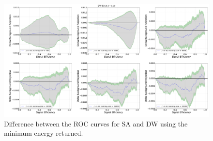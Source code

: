 \begin{figure}[h]
\begin{adjustbox}{center}
\includegraphics[width=\paperwidth]{DW--SA_GS}
\end{adjustbox}
\caption{Difference between the ROC curves for SA and DW using the minimum energy returned.}
\label{fig:SA_DW_GS_droc}
\end{figure}

